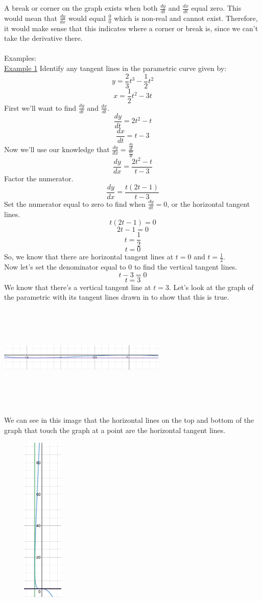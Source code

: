 \documentclass[a4paper,openright, 14pt]{article}
\begin{document}
A break or corner on the graph exists when both $\frac{dy}{dt}$ and $\frac{dx}{dt}$ equal zero. This would mean that $\frac{dy}{dx}$ would equal $\frac{0}{0}$ which is non-real and cannot exist. Therefore, it would make sense that this indicates where a corner or break is, since we can’t take the derivative there. 
\\\\
Examples:\\
\underline{Example 1}
Identify any tangent lines in the parametric curve given by:
$$y=\frac{2}{3}t^3-\frac{1}{2}t^2$$
$$x=\frac{1}{2}t^2-3t$$
First we’ll want to find $\frac{dy}{dt}$ and $\frac{dx}{dt}$.
$$\frac{dy}{dt}=2t^2-t$$
$$\frac{dx}{dt}=t-3$$
Now we’ll use our knowledge that $\frac{dy}{dx}=\frac{\frac{dy}{dt}}{\frac{dx}{dt}}$
$$\frac{dy}{dx}=\frac{2t^2-t}{t-3}$$
Factor the numerator.
$$\frac{dy}{dx}=\frac{t(2t-1)}{t-3}$$
Set the numerator equal to zero to find when $\frac{dy}{dt}=0$, or the horizontal tangent lines.
$$t(2t-1)=0$$
$$2t-1=0$$
$$t=\frac{1}{2}$$
$$t=0$$
So, we know that there are horizontal tangent lines at $t=0$ and $t=\frac{1}{2}$.\\
Now let’s set the denominator equal to 0 to find the vertical tangent lines.
$$t-3=0$$
$$t=3$$
We know that there’s a vertical tangent line at $t=3$. Let’s look at the graph of the parametric with its tangent lines drawn in to show that this is true.
\begin{center}
    \includegraphics[height=5cm, width=8cm]{Images/tangent.png}
\end{center}
We can see in this image that the horizontal lines on the top and bottom of the graph that touch the graph at a point are the horizontal tangent lines.
\begin{center}
    \includegraphics[height=8cm, width=4cm]{Images/tangentline.png}
\end{center}
\end{document}
